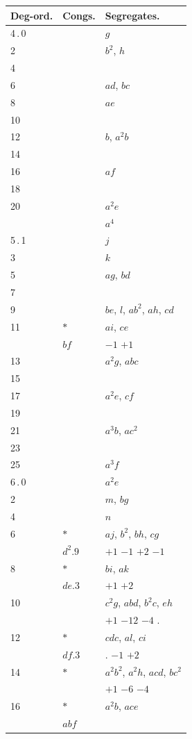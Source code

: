 \documentclass[11pt]{article}
\begin{document}
\begin{center}
\begin{tabular}{lll}
Deg-ord. & Congs. & Segregates. \\
\hline
4\,.\,0 & & $g$ \\
2 & & $b^{2}$, $h$ \\
4 & & \\
6 & & $ad$, $bc$ \\
8 & & $ae$ \\
10 & & \\
12 & & $b$, $a^{2}b$ \\
14 & & \\
16 & & $af$ \\
18 & & \\
20 & & $a^{2}e$ \\
& & $a^{4}$ \\
\hline
5\,.\,1 & & $j$ \\
3 & & $k$ \\
5 & & $ag$, $bd$ \\
7 & & \\
9 & & $be$, $l$, $ab^{2}$, $ah$, $cd$ \\
11 & $*$ & $ai$, $ce$ \\
& $bf$ & $-1$ $+1$ \\
13 & & $a^{2}g$, $abc$ \\
15 & & \\
17 & & $a^{2}e$, $cf$ \\
19 & & \\
21 & & $a^{3}b$, $ac^{2}$ \\
23 & & \\
25 & & $a^{3}f$ \\
\hline
6\,.\,0 & & $a^{2}e$ \\
2 & & $m$, $bg$ \\
4 & & $n$ \\
6 & $*$ & $aj$, $b^{2}$, $bh$, $cg$ \\
& $d^{2}.9$ & $+1$ $-1$ $+2$ $-1$ \\
8 & $*$ & $bi$, $ak$ \\
& $de.3$ & $+1$ $+2$ \\
10 & & $c^{2}g$, $abd$, $b^{2}c$, $eh$ \\
& & $+1$ $-12$ $-4$ \quad . \\
12 & $*$ & $cdc$, $al$, $ci$ \\
& $df.3$ & $.$ $-1$ $+2$ \\
14 & $*$ & $a^{2}b^{2}$, $a^{2}h$, $acd$, $bc^{2}$ \\
& & $+1$ $-6$ $-4$ \\
16 & $*$ & $a^{2}b$, $ace$ \\
& $abf$ & \\
\end{tabular}
\end{center}
\end{document}
